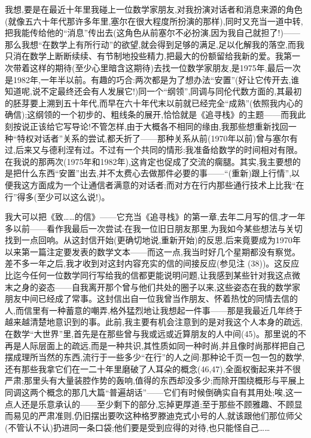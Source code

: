 我想,要是在最近十年里我碰上一位数学家朋友,对我扮演对话者和消息来源的角色(就像五六十年代那许多年里,塞尔在很大程度所扮演的那样),同时又充当一道中转,把我能传给他的“消息”传出去(这角色从前塞尔不必扮演,因为我自己就担了!)——那么我想“在数学上有所行动”的欲望,就会得到足够的满足,足以化解我的落空,而我只消在数学上断断续续、有节制地投些精力,把最大的份额留给我新的爱。我第一次带着这样的期待(至少心里暗含这期待)去找一位数学家朋友,是1975年,最后一次是1982年,一年半以前。有趣的巧合:两次都是为了想办法“安置”(好让它传开去,谁知道呢,说不定最终还会有人发展它!)同一个“纲领”,同调与同伦代数方面的,其最初的胚芽要上溯到五十年代,而早在六十年代末以前就已经完全“成熟”(依照我内心的确信);这纲领的一个初步的、粗线条的展开,恰恰就是《追寻栈》的主题——而我此刻按说正该给它写导论!不管怎样,由于大概各不相同的缘由,我那些想重新找回一种“特权对话者”关系的尝试,都夭折了——那种关系从前(1970年以前)曾与塞尔有过,后来又与德利涅有过。不过有一个共同的情形:我准备给数学的时间相对有限。在我说的那两次(1975年和1982年),这肯定也促成了交流的瘸腿。其实,我主要想的是把什么东西“安置”出去,并不太费心去做那件必要的事——“(重新)跟上行情”,以便我这方面成为一个让通信者满意的对话者;而对方在行内那些通行技术上比我“在行”得多(至少可以这么说!)。

 我大可以把《致……的信》——它充当《追寻栈》的第一章,去年二月写的信,才一年多以前——看作我最后一次尝试:在我一位旧日朋友那里,为我如今某些想法与关切找到一点回响。从这封信开始(更确切地说,重新开始)的反思,后来竟要成为1970年以来第一篇注定要发表的数学文本——而这一点,我当时好几个星期都没有察觉。差不多一年之后,我才收到对这封内容充实的信的间接反应(参见注 (38))。这反应比迄今任何一位数学同行写给我的信都更能说明问题,让我感到某些针对我这点微末之身的姿态——自我离开那个曾与他们共处的圈子以来,这些姿态在我的数学家朋友中间已经成了常事。这封信出自一位我曾当作朋友、怀着热忱的同情去信的人,而信里有一种蓄意的嘲弄,格外猛烈地让我想起一件事——那是我最近几年终于越来越清楚地意识到的事。此前,我主要有机会注意到的是对我这个人本身的疏远,在数学“大世界”里,首先是在那些曾与我或远或近算朋友的人中间(45)。那里说的不再是人际层面上的疏远,而是一种共识,其性质如同一种时尚,并且像时尚那样把自己摆成理所当然的东西,流行于一些多少“在行”的人之间:那种论千页一包一包的数学,还有那些我拿它们在一二十年里磨破了人耳朵的概念(46,47),全面权衡起来并不很严肃;那里头有大量装腔作势的轰响,值得的东西却没多少;而除开围绕概形与平展上同调这两个概念的那几大篇“普遍胡话”——它们有时候倒确实自有其用处;唉,这一点人还是乐意承认的——至少剩下的部分,忘掉更厚道;至于那些不顾雅趣、不顾显而易见的严肃准则,仍旧摆出要吹这种格罗滕迪克式小号的人,就该跟他们那位师父(不管认不认)扔进同一条口袋;他们要是受到应得的对待,也只能怪自己……

